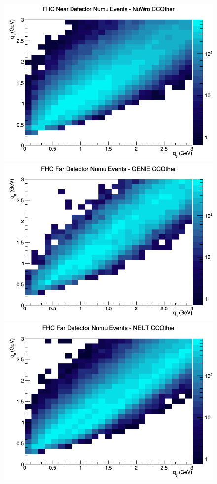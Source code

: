 \begin{figure}[h]
\includegraphics[width=\linewidth]{eff_q0_q3/FGT/CCOther_FHC_ND_numu_q3_q0_NuWro.png}
\endminipage
\newline
{}
\includegraphics[width=\linewidth]{eff_q0_q3/FGT/CCOther_FHC_FD_numu_q3_q0_GENIE.png}
\endminipage
{}
\includegraphics[width=\linewidth]{eff_q0_q3/FGT/CCOther_FHC_FD_numu_q3_q0_NEUT.png}

\end{figure}

